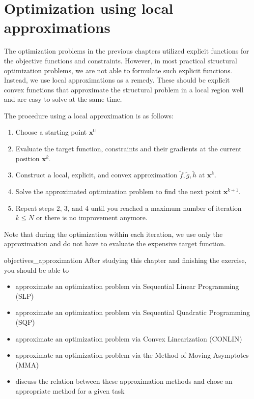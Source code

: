 \chapter{Optimization using local approximations}
The optimization problems in the previous chapters utilized explicit functions for the objective functions and constraints. However, in most practical structural optimization problems, we are not able to formulate such explicit functions. Instead, we use local approximations as a remedy. These should be explicit convex functions that approximate the structural problem in a local region well and are easy to solve at the same time. 

The procedure using a local approximation is as follows:

\begin{enumerate}
    \item Choose a starting point $\mathbf{x}^0$
    \item Evaluate the target function, constraints and their gradients at the current position $\mathbf{x}^k$.
    \item Construct a local, explicit, and convex approximation $\tilde{f}, \tilde{g}, \tilde{h}$ at $\mathbf{x}^k$.
    \item Solve the approximated optimization problem to find the next point $\mathbf{x}^{k+1}$. 
    \item Repeat steps 2, 3, and 4 until you reached a maximum number of iteration $k \le N$ or there is no improvement anymore.
\end{enumerate}

Note that during the optimization within each iteration, we use only the approximation and do not have to evaluate the expensive target function.

\begin{objectives}{}{objectives_approximation}
After studying this chapter and finishing the exercise, you should be able to 
\begin{itemize}[label=$\dots$]
    \item approximate an optimization problem via Sequential Linear Programming (SLP)
    \item approximate an optimization problem via Sequential Quadratic Programming (SQP)
    \item approximate an optimization problem via Convex Linearization (CONLIN)
    \item approximate an optimization problem via the Method of Moving Asymptotes (MMA)
    \item discuss the relation between these approximation methods and chose an appropriate method for a given task
\end{itemize}
\end{objectives}

